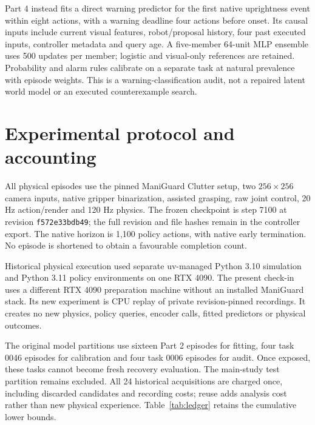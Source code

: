 \documentclass[sigconf,dvipsnames]{acmart}
\begin{document}
Part 4 instead fits a direct warning predictor for the first native uprightness
event within eight actions, with a warning deadline four actions before onset.
Its causal inputs include current visual features, robot/proposal history, four
past executed inputs, controller metadata and query age. A five-member 64-unit
MLP ensemble uses 500 updates per member; logistic and visual-only references are
retained. Probability and alarm rules calibrate on a separate task at natural
prevalence with episode weights. This is a warning-classification audit, not a
repaired latent world model or an executed counterexample search.

\section{Experimental protocol and accounting}
All physical episodes use the pinned ManiGuard Clutter setup, two $256\times256$
camera inputs, native gripper binarization, assisted grasping, raw joint control,
20 Hz action/render and 120 Hz physics. The frozen checkpoint is step 7100 at
revision \texttt{f572e33bdb49}; the full revision and file hashes remain in the
controller export. The native horizon is 1,100 policy actions, with native early
termination. No episode is shortened to obtain a favourable completion count.

Historical physical execution used separate uv-managed Python 3.10 simulation
and Python 3.11 policy environments on one RTX 4090. The present check-in uses a
different RTX 4090 preparation machine without an installed ManiGuard stack. Its
new experiment is CPU replay of private revision-pinned recordings. It creates no
new physics, policy queries, encoder calls, fitted predictors or physical outcomes.

The original model partitions use sixteen Part 2 episodes for fitting, four task
0046 episodes for calibration and four task 0006 episodes for audit. Once exposed,
these tasks cannot become fresh recovery evaluation. The main-study test partition
remains excluded. All 24 historical acquisitions are charged once, including
discarded candidates and recording costs; reuse adds analysis cost rather than
new physical experience. Table~\ref{tab:ledger} retains the cumulative lower bounds.
\end{document}
